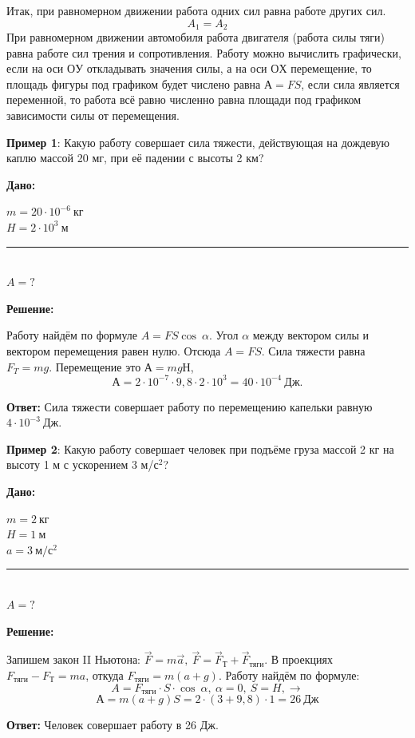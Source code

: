 \documentclass[a6paper, 11pt]{diss_4}
\renewcommand{\'}{\,'}
\begin{document}
  Итак, при равномерном движении работа одних сил равна работе других сил.
\[A_1=A_2\]
  При равномерном движении автомобиля работа двигателя (работа силы тяги)
равна работе сил трения и сопротивления. Работу можно вычислить
графически, если на оси $ОУ$ откладывать значения силы, а на оси $ОХ$ перемещение,
то площадь фигуры под графиком будет числено равна $А = FS$, если сила
является переменной, то работа всё равно численно равна площади под графиком
зависимости силы от перемещения.


  \textbf{Пример 1}: Какую работу совершает сила тяжести, действующая на
дождевую каплю массой 20 мг, при её падении с высоты 2 км?

\hspace{1cm}\textbf{Дано:}\hspace{.3cm}
\parbox[t]{4cm}{
$m=20\cdot10^{-6}\ кг$\\
$H=2\cdot10^3\ м$\\
\rule{4cm}{.4pt}\\
$A=?$\\
}

 \textbf{Решение:}

  Работу найдём по формуле $A=FS\cos\ \alpha$. Угол $\alpha$ между вектором силы
 и вектором перемещения равен нулю. Отсюда $A=FS$. Сила тяжести равна
$F_T=mg$. Перемещение это $А=mgН$,
\[
А=2\cdot10^{-7}\cdot9,8\cdot2\cdot10^3=40\cdot10^{-4}\ Дж.
\]

  \textbf{Ответ:} Сила тяжести совершает работу по перемещению капельки
равную $4\cdot10^{-3}\ Дж$.


  \textbf{Пример 2}: Какую работу совершает человек при подъёме груза массой
2 кг на высоту 1 м с ускорением 3 м/$с^2$?

\hspace{1cm}\textbf{Дано:}\hspace{.3cm}
\parbox[t]{4cm}{
$m=2\ кг$\\
$H=1\ м$\\
$a=3\ м/с^2$\\
\rule{4cm}{.4pt}\\
$A=?$
}

 \textbf{Решение:}

 Запишем закон II Ньютона: $\vec{F}=m\vec{a},\
\vec{F}=\vec{F}_Т+\vec{F}_{тяги}$. В проекциях $F_{тяги}-F_{Т}=ma$, откуда
$F_{тяги}=m(a+g)$. Работу найдём по формуле:
\[
A=F_{тяги}\cdot S\cdot \cos\ \alpha,\ \alpha=0,\ S=H,\to
\]
\[
А=m(a+g)S=2\cdot(3+9,8)\cdot1=26\ Дж
\]

  \textbf{Ответ:} Человек совершает работу в 26 Дж.
\end{document}
